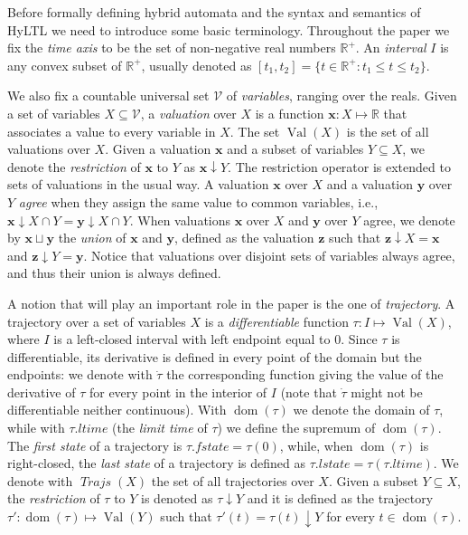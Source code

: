 \documentclass[submission,copyright,creativecommons]{eptcs}
\newcommand{\hyltl}{\textsf{HyLTL}\xspace}
\DeclareMathOperator{\dom}{\mathrm{dom}}
\newcommand{\bbR}{\mathbb{R}}
\newcommand{\cvV}{\mathcal{V}}
\DeclareMathOperator{\Val}{{Val}}
\newcommand{\fstate}{\mathit{fstate}}
\newcommand{\lstate}{\mathit{lstate}}
\newcommand{\ltime}{\mathit{ltime}}
\newcommand{\bx}{\mathbf{x}}
\newcommand{\by}{\mathbf{y}}
\newcommand{\bz}{\mathbf{z}}
\DeclareMathOperator{\trajs}{\mathit{Trajs}}
\newcommand{\rest}{\mathop{\downarrow}}
\newcommand{\valunion}{\mathrel{\sqcup}}
\begin{document}
Before formally defining hybrid automata and the syntax and semantics of \hyltl we need to introduce some basic terminology.
Throughout the paper we fix the \emph{time axis} to be the set of non-negative real numbers $\bbR^+$. An \emph{interval} $I$ is any convex subset of $\bbR^+$, usually denoted as $[t_1, t_2] = \{t \in \bbR^+ : t_1 \leq t \leq t_2\}$. 


We also fix a countable universal set $\cvV$ of \emph{variables}, ranging over the reals. Given a set of variables $X \subseteq \cvV$, a \emph{valuation} over $X$ is a function $\bx: X \mapsto \bbR$ that associates a value to every variable in $X$. The set $\Val(X)$ is the set of all valuations over $X$. Given a valuation $\bx$ and a subset of variables $Y \subseteq X$, we denote the \emph{restriction} of $\bx$ to $Y$ as $\bx\rest Y$. 
The restriction operator is extended to sets of valuations in the usual way. A valuation $\bx$ over $X$ and a valuation $\by$ over $Y$ \emph{agree} when they assign the same value to common variables, i.e., $\bx\rest X\cap Y = \by \rest X \cap Y$. When valuations $\bx$ over $X$ and $\by$ over $Y$ agree, we denote by $\bx\valunion\by$ the \emph{union} of $\bx$ and $\by$, defined as the valuation $\bz$ such that $\bz\rest X = \bx$ and $\bz\rest Y = \by$. Notice that valuations over disjoint sets of variables always agree, and thus their union is always defined.

\medskip

A notion that will play an important role in the paper is the one of \emph{trajectory}. A trajectory over a set of variables $X$ is a \emph{differentiable} function $\tau: I \mapsto \Val(X)$, where $I$ is a left-closed interval with left endpoint equal to $0$. Since $\tau$ is differentiable, its derivative is defined in every point of the domain but the endpoints: we denote with $\dot{\tau}$ the corresponding function giving the value of the derivative of $\tau$ for every point in the interior of $I$ (note that $\dot\tau$ might not be differentiable neither continuous).
With $\dom(\tau)$ we denote the domain of $\tau$, while with $\tau.\ltime$ (the \emph{limit time} of $\tau$) we define the supremum of $\dom(\tau)$. The \emph{first state} of a trajectory is $\tau.\fstate = \tau(0)$, while, when $\dom(\tau)$ is right-closed, the \emph{last state} of a trajectory is defined as $\tau.\lstate = \tau(\tau.\ltime)$. We denote with $\trajs(X)$ the set of all trajectories over $X$. Given a subset $Y \subseteq X$, the \emph{restriction} of $\tau$ to $Y$ is denoted as $\tau\rest Y$ and it is defined as the trajectory $\tau' : \dom(\tau) \mapsto \Val(Y)$ such that $\tau'(t) = \tau(t)\rest Y$ for every $t \in \dom(\tau)$. 
\end{document}
